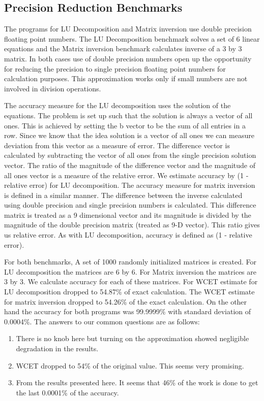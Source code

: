 \subsection{Precision Reduction Benchmarks}
The programs for LU Decomposition and Matrix inversion use double precision floating point numbers. The LU Decomposition benchmark solves a set of 6 linear equations and the Matrix inversion benchmark calculates inverse of a 3 by 3 matrix. In both cases use of double precision numbers open up the opportunity for reducing the precision to single precision floating point numbers for calculation purposes. This approximation works only if small numbers are not involved in division operations.

The accuracy measure for the LU decomposition uses the solution of the equations. The problem is set up such that the solution is always a vector of all ones. This is achieved by setting the b vector to be the sum of all entries in a row. Since we know that the idea solution is a vector of all ones we can measure deviation from this vector as a measure of error. The difference vector is calculated by subtracting the vector of all ones from the single precision solution vector. The ratio of the magnitude of the difference vector and the magnitude of all ones vector is a measure of the relative error. We estimate accuracy by (1 - relative error) for LU decomposition. The accuracy measure for matrix inversion is defined in a similar manner. The difference between the inverse calculated using double precision and single precision numbers is calculated. This difference matrix is treated as a 9 dimensional vector and its magnitude is divided by the magnitude of the double precision matrix (treated as 9-D vector). This ratio gives us relative error. As with LU decomposition, accuracy is defined as (1 - relative error).

For both benchmarks, A set of 1000 randomly initialized matrices is created. For LU decomposition the matrices are 6 by 6. For Matrix inversion the matrices are 3 by 3. We calculate accuracy for each of these matrices. For WCET estimate for LU decomposition dropped to 54.87\% of exact calculation. The WCET estimate for matrix inversion dropped to 54.26\% of the exact calculation. On the other hand the accuracy for both programs was 99.9999\% with standard deviation of 0.0004\%. The answers to our common questions are as follows:

\begin{enumerate}
\item There is no knob here but turning on the approximation showed negligible degradation in the results.
\item WCET dropped to 54\% of the original value. This seems very promising.
\item From the results presented here. It seems that 46\% of the work is done to get the last 0.0001\% of the accuracy. 
\end{enumerate}

